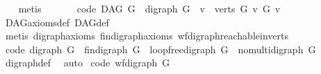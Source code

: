 \begin{isabellebody}
\ \ \isamarkupfalse%
\ metis%
\endisatagproof
{\isafoldproof}%
%
\isadelimproof
\isanewline
%
\endisadelimproof
\ \ \ \ \ \isanewline
{}\isamarkupfalse%
\ {\isacharbrackleft}{\kern0pt}code{\isacharbrackright}{\kern0pt}{\isacharcolon}{\kern0pt}\ {\isachardoublequoteopen}DAG\ G\ {\isacharequal}{\kern0pt}\ {\isacharparenleft}{\kern0pt}digraph\ G\ {\isasymand}\ {\isacharparenleft}{\kern0pt}{\isasymforall}v\ {\isasymin}\ verts\ G{\isachardot}{\kern0pt}\ {\isasymnot}{\isacharparenleft}{\kern0pt}v\ {\isasymrightarrow}\isactrlsup {\isacharplus}{\kern0pt}\isactrlbsub G\isactrlesub \ v{\isacharparenright}{\kern0pt}{\isacharparenright}{\kern0pt}{\isacharparenright}{\kern0pt}{\isachardoublequoteclose}\isanewline
%
\isadelimproof
\ \ %
\endisadelimproof
%
\isatagproof
{}\isamarkupfalse%
\ DAG{\isacharunderscore}{\kern0pt}axioms{\isacharunderscore}{\kern0pt}def\ DAG{\isacharunderscore}{\kern0pt}def\isanewline
\ \ \isamarkupfalse%
\ {\isacharparenleft}{\kern0pt}metis\ digraph{\isachardot}{\kern0pt}axioms{\isacharparenleft}{\kern0pt}{}{\isacharparenright}{\kern0pt}\ fin{\isacharunderscore}{\kern0pt}digraph{\isachardot}{\kern0pt}axioms{\isacharparenleft}{\kern0pt}{}{\isacharparenright}{\kern0pt}\ wf{\isacharunderscore}{\kern0pt}digraph{\isachardot}{\kern0pt}reachable{}{\isacharunderscore}{\kern0pt}in{\isacharunderscore}{\kern0pt}verts{\isacharparenleft}{\kern0pt}{}{\isacharparenright}{\kern0pt}{\isacharparenright}{\kern0pt}%
\endisatagproof
{\isafoldproof}%
%
\isadelimproof
\ \isanewline
%
\endisadelimproof
\isanewline
{}\isamarkupfalse%
\ {\isacharbrackleft}{\kern0pt}code{\isacharbrackright}{\kern0pt}{\isacharcolon}{\kern0pt}\ {\isachardoublequoteopen}digraph\ G\ {\isacharequal}{\kern0pt}\ {\isacharparenleft}{\kern0pt}fin{\isacharunderscore}{\kern0pt}digraph\ G\ {\isasymand}\ loopfree{\isacharunderscore}{\kern0pt}digraph\ G\ {\isasymand}\ nomulti{\isacharunderscore}{\kern0pt}digraph\ G{\isacharparenright}{\kern0pt}{\isachardoublequoteclose}\isanewline
%
\isadelimproof
\ \ %
\endisadelimproof
%
\isatagproof
{}\isamarkupfalse%
\ digraph{\isacharunderscore}{\kern0pt}def\ \isamarkupfalse%
\ auto%
\endisatagproof
{\isafoldproof}%
%
\isadelimproof
\isanewline
%
\endisadelimproof
\isanewline
{}\isamarkupfalse%
\ {\isacharbrackleft}{\kern0pt}code{\isacharbrackright}{\kern0pt}{\isacharcolon}{\kern0pt}\ {\isachardoublequoteopen}wf{\isacharunderscore}{\kern0pt}digraph\ G\ {\isacharequal}{\kern0pt}\ {\isacharparenleft}{\kern0pt}\isanewline

\end{isabellebody}
